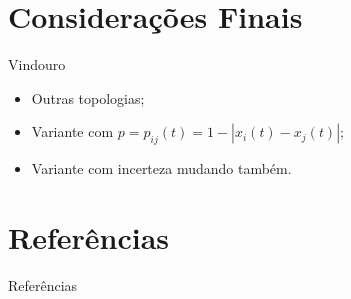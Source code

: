 \documentclass{beamer}
\begin{document}
\section{Considerações Finais}

\begin{frame}{Vindouro}
  \begin{itemize}
  \item Outras topologias;
  \item Variante com \(p = p_{ij}(t) = 1 - | x_i(t) - x_j(t)| \);
  \item Variante com incerteza mudando também.
  \end{itemize}
  
\end{frame}

\section*{Referências}
\begin{frame}[allowframebreaks]{Referências}
\printbibliography[heading=none]
\end{frame}
\end{document}

